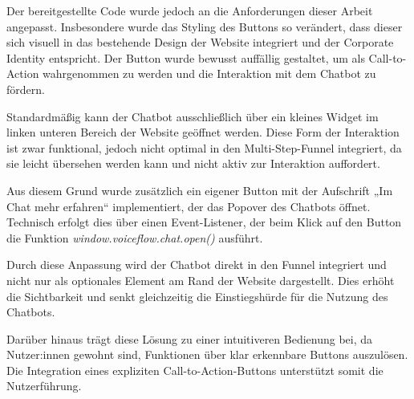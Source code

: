 Der bereitgestellte Code wurde jedoch an die Anforderungen dieser Arbeit 
angepasst. Insbesondere wurde das Styling des Buttons so verändert, dass 
dieser sich visuell in das bestehende Design der Website integriert und 
der Corporate Identity entspricht. Der Button wurde bewusst auffällig 
gestaltet, um als Call-to-Action wahrgenommen zu werden und die Interaktion 
mit dem Chatbot zu fördern.

Standardmäßig kann der Chatbot ausschließlich über ein kleines Widget im 
linken unteren Bereich der Website geöffnet werden. Diese Form der 
Interaktion ist zwar funktional, jedoch nicht optimal in den 
Multi-Step-Funnel integriert, da sie leicht übersehen werden kann und 
nicht aktiv zur Interaktion auffordert.

Aus diesem Grund wurde zusätzlich ein eigener Button mit der Aufschrift 
„Im Chat mehr erfahren“ implementiert, der das Popover des Chatbots 
öffnet. Technisch erfolgt dies über einen Event-Listener, der beim Klick 
auf den Button die Funktion \textit{window.voiceflow.chat.open()} ausführt.

Durch diese Anpassung wird der Chatbot direkt in den 
Funnel integriert und nicht nur als optionales Element am Rand der 
Website dargestellt. Dies erhöht die Sichtbarkeit und senkt gleichzeitig 
die Einstiegshürde für die Nutzung des Chatbots.

Darüber hinaus trägt diese Lösung zu einer intuitiveren Bedienung bei, da 
Nutzer:innen gewohnt sind, Funktionen über klar erkennbare 
Buttons auszulösen. Die Integration eines expliziten Call-to-Action-Buttons 
unterstützt somit die Nutzerführung.

